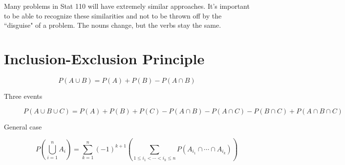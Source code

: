 \documentclass{article}
\begin{document}
 

\header

Many problems in Stat 110 will have extremely similar approaches. It's important to be able to recognize these similarities and not to be thrown off by the ``disguise" of a problem. The nouns change, but the verbs stay the same.

\section{Inclusion-Exclusion Principle} 

$$P(A \cup B) = P(A) + P(B) - P(A \cap B)$$

\begin{description}
    \item[Three events] $P(A \cup B \cup C) = P(A) + P(B) + P(C) - P(A \cap B) - P(A \cap C) - P(B \cap C) + P(A \cap B \cap C)$
    
    \item[General case] $$P\left(\bigcup_{i=1}^n A_i\right) = \sum_{k = 1}^n (-1)^{k+1} \left( \sum_{1 \leq i_1 < \cdots < i_k \leq n} P( A_{i_1} \cap \cdots \cap A_{i_k} ) \right)$$
\end{description}



\end{document}
